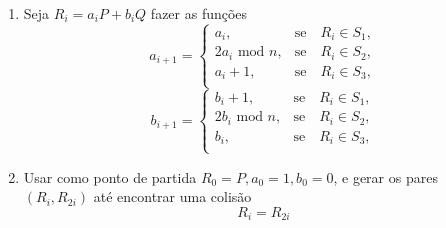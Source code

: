 \documentclass{beamer}
\newcounter{saveenumi}
\newcommand{\conti}{\setcounter{enumi}{\value{saveenumi}}}
\begin{document}
\begin{frame}
  \begin{enumerate}
    \conti
    \item Seja $R_i = a_iP + b_iQ$ fazer as funções
      $$
        a_{i+1}=\left\{\begin{array}{rc}
        a_i,&\mbox{se}\quad R_i \in S_1,\\
        2a_i \mbox{ mod }n,&\mbox{se}\quad R_i \in S_2,\\
        a_i + 1,&\mbox{se}\quad R_i \in S_3,\\
        \end{array}\right.
      $$
      $$
        b_{i+1}=\left\{\begin{array}{rc}
        b_i + 1,&\mbox{se}\quad R_i \in S_1,\\
        2b_i \mbox{ mod }n,&\mbox{se}\quad R_i \in S_2,\\
        b_i,&\mbox{se}\quad R_i \in S_3,\\
        \end{array}\right.
      $$
    \item Usar como ponto de partida $R_0 = P, a_0 = 1, b_0 = 0$, e gerar os pares $(R_i, R_{2i})$ até encontrar uma colisão
      $$ R_i = R_{2i} $$
    \conti
  \end{enumerate}
\end{frame}

%
%

\end{document}
